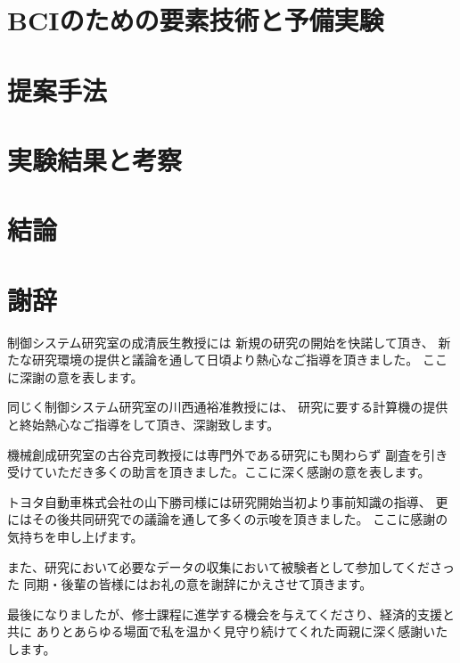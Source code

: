 \documentclass[a4j,12pt, oneside, openany, report]{jsbook}
\begin{document}
\chapter{{\rm BCI}{\mc のための要素技術と予備実験}}
\label{chapter:BCIのための要素技術}
% 




\chapter{\mc 提案手法}


% 
% 

\chapter{\mc 実験結果と考察}

% 


\chapter{\mc 結論}


%
\chapter*{謝辞}
制御システム研究室の成清辰生教授には
新規の研究の開始を快諾して頂き、
新たな研究環境の提供と議論を通して日頃より熱心なご指導を頂きました。
ここに深謝の意を表します。

同じく制御システム研究室の川西通裕准教授には、
研究に要する計算機の提供と終始熱心なご指導をして頂き、深謝致します。

機械創成研究室の古谷克司教授には専門外である研究にも関わらず
副査を引き受けていただき多くの助言を頂きました。ここに深く感謝の意を表します。

トヨタ自動車株式会社の山下勝司様には研究開始当初より事前知識の指導、
更にはその後共同研究での議論を通して多くの示唆を頂きました。
ここに感謝の気持ちを申し上げます。

また、研究において必要なデータの収集において被験者として参加してくださった
同期・後輩の皆様にはお礼の意を謝辞にかえさせて頂きます。

最後になりましたが、修士課程に進学する機会を与えてくださり、経済的支援と共に
ありとあらゆる場面で私を温かく見守り続けてくれた両親に深く感謝いたします。


%

% 


%
% 
%
%
\newpage
\printindex
%
%
\end{document}
